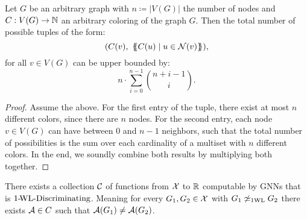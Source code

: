 \begin{lemma}\label{lem:1wl_color_upper_bound}
    Let $G$ be an arbitrary graph with $n \coloneqq |V(G)|$ the number of nodes and $C: V(G) \rightarrow \mathbb{N}$ an arbitrary coloring of the graph $G$. Then the total number of possible tuples of the form:
    \begin{equation*}
        (C(v), \ \{\!\!\{ C(u) \mid u \in \mathcal{N}(v) \}\!\!\}),
    \end{equation*}
    for all $v \in V(G)$ can be upper bounded by:
    \begin{equation*}
        n \cdot \sum_{i=0}^{n-1} \binom{n+i -1}{i}.
    \end{equation*}
\end{lemma}

\begin{proof}
    Assume the above. For the first entry of the tuple, there exist at most $n$ different colors, since there are $n$ nodes. For the second entry, each node $v \in V(G)$ can have between $0$ and $n-1$ neighbors, such that the total number of possibilities is the sum over each cardinality of a multiset with $n$ different colors. In the end, we soundly combine both results by multiplying both together.
\end{proof}


\begin{lemma}\label{lem:gnn_1wl_disc}
    There exists a collection $\mathcal{C}$ of functions from $\mathcal{X}$ to $\mathbb{R}$ computable by GNNs that is $\text{1-\!WL-Discriminating}$. Meaning for every $G_1, G_2 \in \mathcal{X}$ with $G_1 \not\simeq_{\text{1WL}} G_2$ there exists $\mathcal{A} \in C$ such that $\mathcal{A}(G_1) \neq \mathcal{A}(G_2)$.
\end{lemma}

